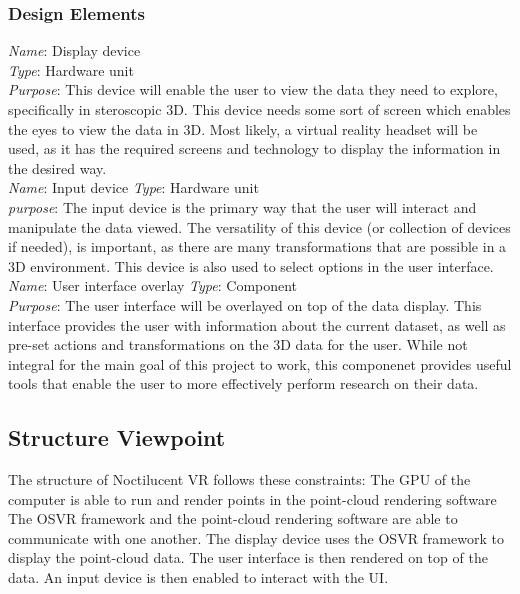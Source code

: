 \documentclass{article}
\begin{document}
\subsubsection{Design Elements}

        \textit{Name}: Display device\\
        \textit{Type}: Hardware unit\\
        \textit{Purpose}: This device will enable the user to view the data they need to explore, specifically in steroscopic 3D. 
        This device needs some sort of screen which enables the eyes to view the data in 3D. Most likely, a virtual reality headset
        will be used, as it has the required screens and technology to display the information in the desired way.\\
\newline
        \textit{Name}: Input device
        \textit{Type}: Hardware unit\\
        \textit{purpose}: The input device is the primary way that the user will interact and manipulate the data viewed. 
        The versatility of this device (or collection of devices if needed), is important, as there are many transformations
        that are possible in a 3D environment. This device is also used to select options in the user interface.\\
\newline
        \textit{Name}: User interface overlay
        \textit{Type}: Component\\
        \textit{Purpose}: The user interface will be overlayed on top of the data display. This interface provides
        the user with information about the current dataset, as well as pre-set actions and transformations on the 
        3D data for the user. While not integral for the main goal of this project to work, this componenet provides
        useful tools that enable the user to more effectively perform research on their data.

\subsection{Structure Viewpoint}

The structure of Noctilucent VR follows these constraints:
The GPU of the computer is able to run and render points in the point-cloud rendering software
The OSVR framework and the point-cloud rendering software are able to communicate with one another.
The display device uses the OSVR framework to display the point-cloud data.
The user interface is then rendered on top of the data.
An input device is then enabled to interact with the UI.
\end{document}
